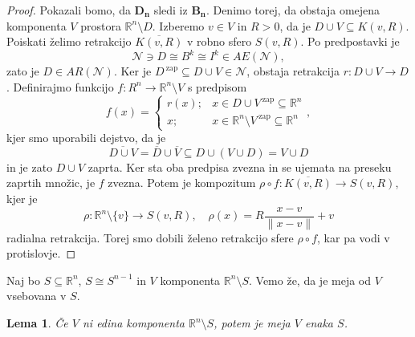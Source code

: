 \documentclass[10pt, a4paper]{article}
\newtheorem{lema}[izr]{Lema}
\newenvironment{noticeC}{%
  \tcolorbox[%
  notitle,
  empty,
  enhanced,  %
  breakable,
  coltext=black, 
  fontupper=\rmfamily,
  noparskip,
  sharp corners,
  boxrule=-1pt,  %
  frame hidden,
  left=7pt,  %
  right=7pt,
  top=5pt,
  bottom=5pt,
  before skip=2.5ex plus 2pt,
  after skip=2.5ex plus 2pt,
  overlay unbroken and last={%
  },
  ]}
{\endtcolorbox}
\newenvironment{dokaz}%
  {\begin{noticeC}\begin{proof}}%
  {\end{proof}\end{noticeC}}
\newcommand{\R}{\mathbb {R}}
\begin{document}
\begin{dokaz}
  Pokazali bomo, da $\mathbf{D_n}$ sledi iz $\mathbf{B_n}$. Denimo torej, da obstaja omejena komponenta $V$ prostora $\R^n \setminus D$.
  Izberemo $v \in V$ in $R > 0$, da je $D \cup V \subseteq K(v, R)$. Poiskati želimo retrakcijo $\overline{K(v, R)}$ v robno 
  sfero $S(v, R)$. Po predpostavki je 
  $$\mathcal{N} \ni D \cong B^k \cong I^k \in AE(\mathcal{N}),$$
  zato je $D \in AR(\mathcal{N})$. Ker je $D^{\ \text{zap}} \subseteq D \cup V \in \mathcal{N}$, obstaja retrakcija 
  $r: D \cup V \to D$. Definirajmo funkcijo $f: R^n \to \R^n \setminus V$ s predpisom 
  $$f(x) = \begin{cases}
    r(x) ;& x \in D \cup V^{\ \text{zap}} \subseteq \R^n\\
    x ;& x \in \R^n \setminus V^{\ \text{zap}} \subseteq \R^n
  \end{cases},$$
  kjer smo uporabili dejstvo, da je $$\overline{D \cup V} = \overline{D} \cup \overline{V} \subseteq D \cup (V \cup D) = V \cup D$$
  in je zato $D \cup V$ zaprta. Ker sta oba predpisa zvezna in se ujemata na preseku zaprtih množic,
  je $f$ zvezna. Potem je kompozitum $\rho \circ f: \overline{K(v, R)} \to S(v, R)$, kjer je 
  $$\rho: \R^n \setminus \{v\} \to S(v, R),\quad \rho (x) = R \frac{x - v}{\|x - v\|} + v$$
  radialna retrakcija. Torej smo dobili želeno retrakcijo sfere $\rho \circ f$, kar pa vodi v protislovje.
\end{dokaz}

Naj bo $S \subseteq \R^n$, $S \cong S^{n - 1}$ in $V$ komponenta $\R^n \setminus S$. Vemo že,
da je meja od $V$ vsebovana v $S$.

\begin{lema}
  Če $V$ ni edina komponenta $\R^n \setminus S$, potem je meja $V$ enaka $S$.
\end{lema}
\end{document}
